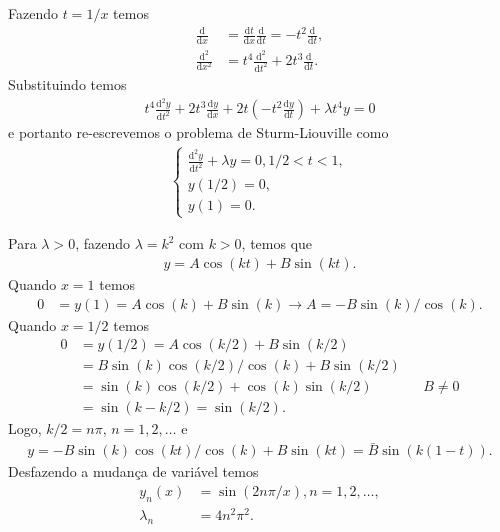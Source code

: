 \documentclass[a4paper,12pt, leqno, answers]{exam}
\begin{document}
\begin{questions}
\begin{parts}
\begin{solution}
            Fazendo $t = 1/x$ temos
            \begin{align*}
                \frac{\mathrm{d}}{\mathrm{d}x} &= \frac{\mathrm{d}t}{\mathrm{d}x} \frac{\mathrm{d}}{\mathrm{d}t} = -t^2 \frac{\mathrm{d}}{\mathrm{d}t}, \\
                \frac{\mathrm{d}^2}{\mathrm{d}x^2} &= t^4 \frac{\mathrm{d}^2}{\mathrm{d}t^2} + 2 t^3 \frac{\mathrm{d}}{\mathrm{d}t}.
            \end{align*}
            Substituindo temos
            \begin{align*}
                t^4 \frac{\mathrm{d}^2y}{\mathrm{d}t^2} + 2 t^3 \frac{\mathrm{d}y}{\mathrm{d}x} + 2 t \left( - t^2 \frac{\mathrm{d}y}{\mathrm{d}t} \right) + \lambda t^4 y = 0
            \end{align*}
            e portanto re-escrevemos o problema de Sturm-Liouville como
            \begin{align*}
                \begin{cases}
                    \frac{\mathrm{d}^2y}{\mathrm{d}t^2} + \lambda y = 0, 1/2 < t < 1, \\
                    y(1/2) = 0, \\
                    y(1) = 0.
                \end{cases}
            \end{align*}

            Para $\lambda > 0$, fazendo $\lambda = k^2$ com $k > 0$, temos que
            \begin{align*}
                y = A \cos(k t) + B \sin(k t).
            \end{align*}
            Quando $x = 1$ temos
            \begin{align*}
                0 &= y(1) = A \cos(k) + B \sin(k) \to A = - B \sin(k) / \cos(k).
            \end{align*}
            Quando $x = 1/2$ temos
            \begin{align*}
                0 &= y(1/2) = A \cos(k/2) + B \sin(k/2) \\
                &= B \sin(k) \cos(k/2) / \cos(k) + B \sin(k/2) \\
                &= \sin(k) \cos(k/2) + \cos(k) \sin(k/2) && B \neq 0 \\
                &= \sin(k - k/2) = \sin(k/2).
            \end{align*}
            Logo, $k/2 = n \pi$, $n = 1, 2, \ldots$ e
            \begin{align*}
                y = - B \sin(k) \cos(k t) / \cos(k) + B \sin(k t) = \bar{B} \sin(k (1 - t)).
            \end{align*}
            Desfazendo a mudan\c{c}a de vari\'{a}vel temos
            \begin{align*}
                y_n(x) &= \sin(2 n \pi / x), n = 1, 2, \ldots, \\
                \lambda_n &= 4 n^2 \pi^2.
            \end{align*}


\end{solution}
\end{parts}
\end{questions}
\end{document}
